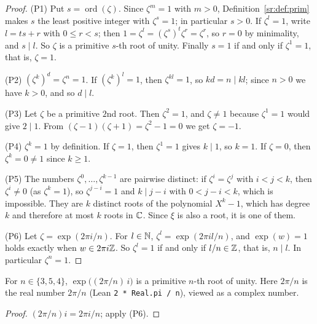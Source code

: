 \begin{proof}
(P1) Put $s=\operatorname{ord}(\zeta)$. Since $\zeta^m=1$ with $m>0$, Definition~\ref{sr:def:prim} makes $s$ the least
positive integer with $\zeta^s=1$; in particular $s>0$. If $\zeta^l=1$, write $l=ts+r$ with $0\le r<s$; then
$1=\zeta^l=(\zeta^s)^t\zeta^r=\zeta^r$, so $r=0$ by minimality, and $s\mid l$. So $\zeta$ is a primitive $s$-th root of
unity. Finally $s=1$ if and only if $\zeta^1=1$, that is, $\zeta=1$.

(P2) $(\zeta^k)^d=\zeta^n=1$. If $(\zeta^k)^l=1$, then $\zeta^{kl}=1$, so $kd=n\mid kl$; since $n>0$ we have $k>0$, and
so $d\mid l$.

(P3) Let $\zeta$ be a primitive $2$nd root. Then $\zeta^2=1$, and $\zeta\ne1$ because $\zeta^1=1$ would give $2\mid1$.
From $(\zeta-1)(\zeta+1)=\zeta^2-1=0$ we get $\zeta=-1$.

(P4) $\zeta^k=1$ by definition. If $\zeta=1$, then $\zeta^1=1$ gives $k\mid1$, so $k=1$. If $\zeta=0$, then
$\zeta^k=0\ne1$ since $k\ge1$.

(P5) The numbers $\zeta^0,\dots,\zeta^{k-1}$ are pairwise distinct: if $\zeta^i=\zeta^j$ with $i<j<k$, then
$\zeta^i\ne0$ (as $\zeta^k=1$), so $\zeta^{j-i}=1$ and $k\mid j-i$ with $0<j-i<k$, which is impossible. They are $k$
distinct roots of the polynomial $X^k-1$, which has degree $k$ and therefore at most $k$ roots in $\mathbb C$. Since $\xi$ is
also a root, it is one of them.

(P6) Let $\zeta=\exp(2\pi i/n)$. For $l\in\mathbb N$, $\zeta^l=\exp(2\pi il/n)$, and $\exp(w)=1$ holds exactly when $w\in2\pi
i\mathbb Z$. So $\zeta^l=1$ if and only if $l/n\in\mathbb Z$, that is, $n\mid l$. In particular $\zeta^n=1$.
\end{proof}

\begin{lemma}\label{sr:lem:rot345}
For $n\in\{3,5,4\}$, $\exp\bigl((2\pi/n)\,i\bigr)$ is a primitive $n$-th root of unity. Here $2\pi/n$ is the real
number $2\pi/n$ (Lean \texttt{2 * Real.pi / n}), viewed as a complex number.
\end{lemma}

\begin{proof}
$(2\pi/n)i=2\pi i/n$; apply (P6).
\end{proof}

